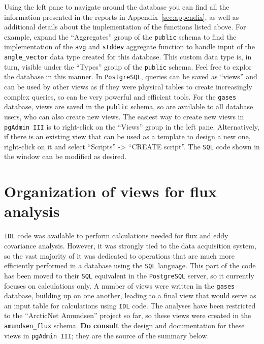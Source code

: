 \documentclass[12pt,letterpaper,titlepage,headings=small,numbers=noenddot]%
{scrartcl}
\begin{document}
Using the left pane to navigate around the database you can find all the
information presented in the reports in Appendix~\ref{sec:appendix}, as
well as additional details about the implementation of the functions listed
above.  For example, expand the ``Aggregates'' group of the \texttt{public}
schema to find the implementation of the \texttt{avg} and \texttt{stddev}
aggregate function to handle input of the \texttt{angle\_vector} data type
created for this database.  This custom data type is, in turn, visible
under the ``Types'' group of the \texttt{public} schema.  Feel free to
explor the database in this manner.  In \texttt{PostgreSQL}, queries can be
saved as ``views'' and can be used by other views as if they were physical
tables to create increasingly complex queries, so can be very powerful and
efficient tools.  For the \texttt{gases} database, views are saved in the
\texttt{public} schema, so are available to all database users, who can
also create new views.  The easiest way to create new views in
\texttt{pgAdmin III} is to right-click on the ``Views'' group in the left
pane.  Alternatively, if there is an existing view that can be used as a
template to design a new one, right-click on it and select ``Scripts'' ->
``CREATE script''.  The \texttt{SQL} code shown in the window can be
modified as desired.

\section{Organization of views for flux
  analysis}
\label{sec:org-views-flux}

\texttt{IDL} code was available to perform calculations needed for flux and
eddy covariance analysis.  However, it was strongly tied to the data
acquisition system, so the vast majority of it was dedicated to operations
that are much more efficiently performed in a database using the
\texttt{SQL} language.  This part of the code has been moved to their
\texttt{SQL} equivalent in the \texttt{PostgreSQL} server, so it currently
focuses on calculations only.  A number of views were written in the
\texttt{gases} database, building up on one another, leading to a final
view that would serve as an input table for calculations using \texttt{IDL}
code.  The analyses have been restricted to the ``ArcticNet Amundsen''
project so far, so these views were created in the \texttt{amundsen\_flux}
schema.  \textbf{Do consult} the design and documentation for these views
in \texttt{pgAdmin III}; they are the source of the summary below.
\end{document}
